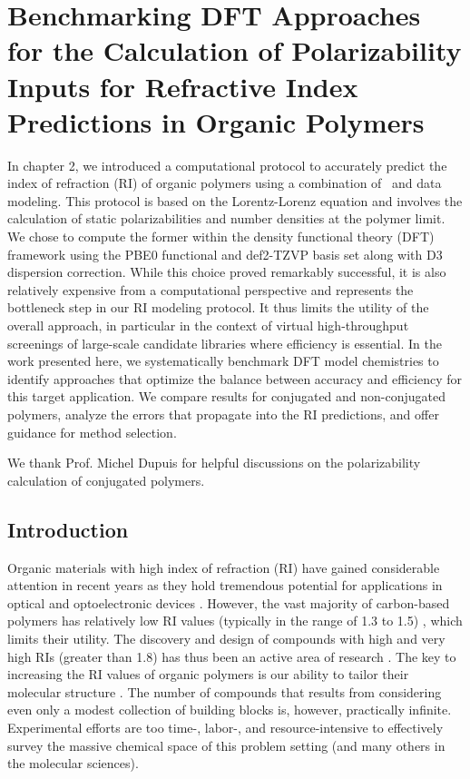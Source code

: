 \chapter{Benchmarking DFT Approaches for the Calculation of Polarizability Inputs for Refractive Index Predictions in Organic Polymers}

In chapter 2, we introduced a computational protocol to accurately predict the index of refraction (RI) of organic polymers using a combination of \firstprinciples\ and data modeling. This protocol is based on the Lorentz-Lorenz equation and involves the calculation of static polarizabilities and number densities at the polymer limit. We chose to compute the former within the density functional theory (DFT) framework using the PBE0 functional and def2-TZVP basis set along with D3 dispersion correction. While this choice proved remarkably successful, it is also relatively expensive from a computational perspective and represents the bottleneck step in our RI modeling protocol. It thus limits the utility of the overall approach, in particular in the context of virtual high-throughput screenings of large-scale candidate libraries where efficiency is essential. In the work presented here, we systematically benchmark DFT model chemistries to identify approaches that optimize the balance between accuracy and efficiency for this target application. We compare results for conjugated and non-conjugated polymers, analyze the errors that propagate into the RI predictions, and offer guidance for method selection. 

We thank Prof. Michel Dupuis for helpful discussions on the polarizability calculation of conjugated polymers. 

\section{Introduction}
\label{sec:introduction}
Organic materials with high index of refraction (RI) have gained considerable attention in recent years as they hold tremendous potential for applications in optical and optoelectronic devices \cite{Higashihara2015,Liou2010,Huang2016,Lei2014,Sun2008}. 
However, the vast majority of carbon-based polymers has relatively low RI values (typically in the range of 1.3 to 1.5) \cite{Liu2009,Liu2008c}, which limits their utility.
The discovery and design of compounds with high and very high RIs (greater than 1.8) has thus been an active area of research \cite{Jintoku2014,Griebel2014}. 
The key to increasing the RI values of organic polymers is our ability to tailor their molecular structure 
\cite{Liu2009,Javadi2013,Gazzo2016,Griebel2014}. The number of compounds that results from considering even only a modest collection of building blocks is, however, practically infinite. Experimental efforts are too time-, labor-, and resource-intensive to effectively survey the massive chemical space of this problem setting (and many others in the molecular sciences). 

